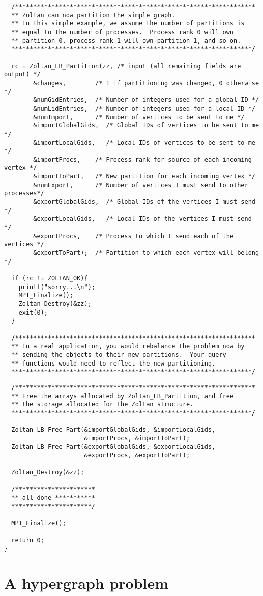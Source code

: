 \clearpage
\begin{flushleft}
\begin{verbatim}
  /******************************************************************
  ** Zoltan can now partition the simple graph.
  ** In this simple example, we assume the number of partitions is
  ** equal to the number of processes.  Process rank 0 will own
  ** partition 0, process rank 1 will own partition 1, and so on.
  ******************************************************************/

  rc = Zoltan_LB_Partition(zz, /* input (all remaining fields are output) */
        &changes,        /* 1 if partitioning was changed, 0 otherwise */ 
        &numGidEntries,  /* Number of integers used for a global ID */
        &numLidEntries,  /* Number of integers used for a local ID */
        &numImport,      /* Number of vertices to be sent to me */
        &importGlobalGids,  /* Global IDs of vertices to be sent to me */
        &importLocalGids,   /* Local IDs of vertices to be sent to me */
        &importProcs,    /* Process rank for source of each incoming vertex */
        &importToPart,   /* New partition for each incoming vertex */
        &numExport,      /* Number of vertices I must send to other processes*/
        &exportGlobalGids,  /* Global IDs of the vertices I must send */
        &exportLocalGids,   /* Local IDs of the vertices I must send */
        &exportProcs,    /* Process to which I send each of the vertices */
        &exportToPart);  /* Partition to which each vertex will belong */

  if (rc != ZOLTAN_OK){
    printf("sorry...\n");
    MPI_Finalize();
    Zoltan_Destroy(&zz);
    exit(0);
  }

  /******************************************************************
  ** In a real application, you would rebalance the problem now by
  ** sending the objects to their new partitions.  Your query 
  ** functions would need to reflect the new partitioning.
  ******************************************************************/
\end{verbatim}
\end{flushleft}

\clearpage
\begin{flushleft}
\begin{verbatim}
  /******************************************************************
  ** Free the arrays allocated by Zoltan_LB_Partition, and free
  ** the storage allocated for the Zoltan structure.
  ******************************************************************/

  Zoltan_LB_Free_Part(&importGlobalGids, &importLocalGids, 
                      &importProcs, &importToPart);
  Zoltan_LB_Free_Part(&exportGlobalGids, &exportLocalGids, 
                      &exportProcs, &exportToPart);

  Zoltan_Destroy(&zz);

  /**********************
  ** all done ***********
  **********************/

  MPI_Finalize();

  return 0;
}
\end{verbatim}
\end{flushleft}

\newpage
\section{A hypergraph problem}
